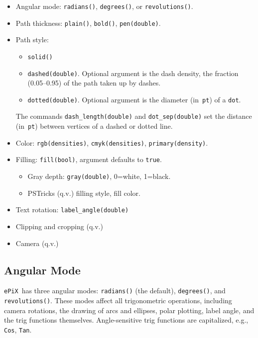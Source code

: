 \documentclass[12pt]{report}
\newcommand{\code}[1]{\texttt{#1}}
\newcommand{\ePiX}{\code{ePiX}}
\begin{document}
\begin{itemize}
\item Angular mode: \code{radians()}, \code{degrees()}, or
  \code{revolutions()}.

\item Path thickness: \code{plain()}, \code{bold()},
  \code{pen(double)}.

\item Path style:
  \begin{itemize}
  \item \code{solid()}
  \item \code{dashed(double)}. Optional argument is the dash density,
    the fraction (0.05--0.95) of the path taken up by dashes.
  \item \code{dotted(double)}. Optional argument is the diameter
    (in~\code{pt}) of a \code{dot}. 
  \end{itemize}
  The commands \code{dash\_length(double)} and \code{dot\_sep(double)}
  set the distance (in~\code{pt}) between vertices of a dashed or
  dotted line.
  
\item Color: \code{rgb(densities)}, \code{cmyk(densities)},
  \code{primary(density)}.

\item Filling: \code{fill(bool)}, argument defaults to \code{true}.
  \begin{itemize}
    \item Gray depth: \code{gray(double)}, 0=white, 1=black.
    \item PSTricks (q.v.) filling style, fill color.
  \end{itemize}

\item Text rotation: \code{label\_angle(double)}

\item Clipping and cropping (q.v.)

\item Camera (q.v.)
\end{itemize}


\subsection*{Angular Mode} 

\ePiX\ has three angular modes: \code{radians()} (the default),
\code{degrees()}, and \code{revolutions()}.  These modes affect all
trigonometric operations, including camera rotations, the drawing of
arcs and ellipses, polar plotting, label angle, and the trig functions
themselves. Angle-sensitive trig functions are capitalized, e.g.,
\code{Cos}, \code{Tan}.
\end{document}
